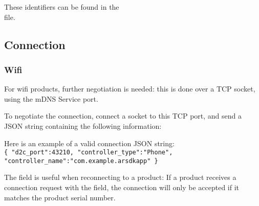 These identifiers can be found in the \\
 file.

\newpage

\subsection{Connection}

\subsubsection{Wifi}

For wifi products, further negotiation is needed: this is done over a TCP socket, using the mDNS Service port.

To negotiate the connection, connect a socket to this TCP port, and send a JSON string containing the following information:
\begin{table}[h]
\centering
{}
\caption{Available keys for connection JSON}
\end{table}

Here is an example of a valid connection JSON string:\\
\texttt{\{ "d2c\_port":43210, "controller\_type":"Phone", \\
"controller\_name":"com.example.arsdkapp" \}}


The  field is useful when reconnecting to a product: If a product receives a connection request with the  field, the connection will only be accepted if it matches the product serial number.

\newpage


